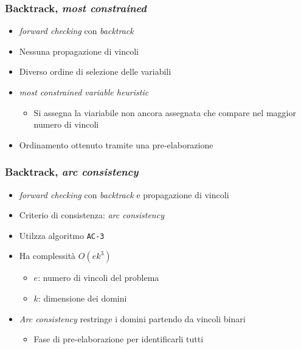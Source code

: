 \documentclass{beamer}
\begin{document}
\begin{frame}
\frametitle{Backtrack, \textit{most constrained}}

\begin{itemize}
	\item \textit{forward checking} con \textit{backtrack}
	\item Nessuna propagazione di vincoli
	\item Diverso ordine di selezione delle variabili
	\item \textit{most constrained variable heuristic} 
		\begin{itemize}
			\item Si assegna la viariabile non ancora assegnata che compare nel maggior numero di vincoli
		\end{itemize}
	\item Ordinamento ottenuto tramite una pre-elaborazione
\end{itemize}

\end{frame}

\begin{frame}
\frametitle{Backtrack, \textit{arc consistency}}

\begin{itemize}
	\item \textit{forward checking} con \textit{backtrack} e propagazione di vincoli
	\item Criterio di consistenza: \textit{arc consistency}
	\item Utilzza algoritmo \texttt{AC-3}
	\item Ha complessità $O(ek^3)$
		\begin{itemize}
			\item $e$: numero di vincoli del problema
			\item $k$: dimensione dei domini
		\end{itemize}
	\item \textit{Arc consistency} restringe i domini partendo da vincoli binari
		\begin{itemize}
			\item Fase di pre-elaborazione per identificarli tutti
		\end{itemize}
\end{itemize}

\end{frame}
\end{document}
